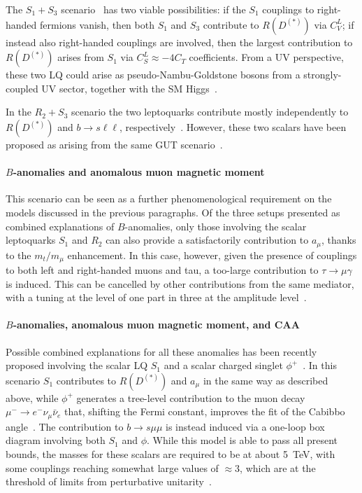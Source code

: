 \documentclass[10pt]{article}
\begin{document}
The $S_1 + S_3$ scenario~\cite{Crivellin:2017zlb,Buttazzo:2017ixm,Marzocca:2018wcf,Arnan:2019olv,Crivellin:2019dwb,Saad:2020ihm,Crivellin:2020ukd,Gherardi:2020qhc,DaRold:2020bib,Bordone:2020lnb} has two viable possibilities: if the $S_1$ couplings to right-handed fermions vanish, then both $S_1$ and $S_3$ contribute to $R(D^{(*)})$ via $C_V^L$; if instead also right-handed couplings are involved, then the largest contribution to $R(D^{(*)})$ arises from $S_1$ via $C_S^L \approx - 4 C_T$ coefficients. From a UV perspective, these two LQ could arise as pseudo-Nambu-Goldstone bosons from a strongly-coupled UV sector, together with the SM Higgs~\cite{Marzocca:2018wcf,DaRold:2020bib}.

In the $R_2 + S_3$ scenario the two leptoquarks contribute mostly independently to  $R(D^{(*)})$ and $b\to s \ell \ell$, respectively~\cite{Babu:2020hun, Dorsner:2017ufx, Saad:2020ucl}. However, these two scalars have been proposed as arising from the same GUT scenario~\cite{Becirevic:2018afm}.

\paragraph{\boldmath $B$-anomalies and anomalous muon magnetic moment}
%
This scenario can be seen as a further phenomenological requirement on the models discussed in the previous paragraphs. Of the three setups presented as combined explanations of $B$-anomalies, only those involving the scalar leptoquarks $S_1$ and $R_2$ can also provide a satisfactorily contribution to $a_\mu$, thanks to the $m_t / m_\mu$ enhancement.
In this case, however, given the presence of couplings to both left and right-handed muons and tau, a too-large contribution to $\tau \to \mu \gamma$ is induced. This can be cancelled by other contributions from the same mediator, with a tuning at the level of one part in three at the amplitude level~\cite{Crivellin:2019dwb,Saad:2020ihm,Gherardi:2020qhc}.

 

\paragraph{\boldmath $B$-anomalies, anomalous muon magnetic moment, and CAA}
%
Possible combined explanations for all these anomalies has been recently proposed involving the scalar LQ $S_1$ and a scalar charged singlet $\phi^+$~\cite{Marzocca:2021azj}. In this scenario $S_1$ contributes to $R(D^{(*)})$ and $a_\mu$ in the same way as described above, while $\phi^+$ generates a tree-level contribution to the muon decay $\mu^- \to e^- \nu_\mu \bar{\nu}_e$ that, shifting the Fermi constant, improves the fit of the Cabibbo angle~\cite{Crivellin:2020oup,Crivellin:2020klg,Felkl:2021qdn,Crivellin:2021njn}. The contribution to $b\to s \mu\mu$ is instead induced via a one-loop box diagram involving both $S_1$ and $\phi$. While this model is able to pass all present bounds, the masses for these scalars are required to be at about 5~TeV, with some couplings reaching somewhat large values of $\approx 3$, which are at the threshold of limits from perturbative unitarity~\cite{Allwicher:2021rtd}.
\end{document}
